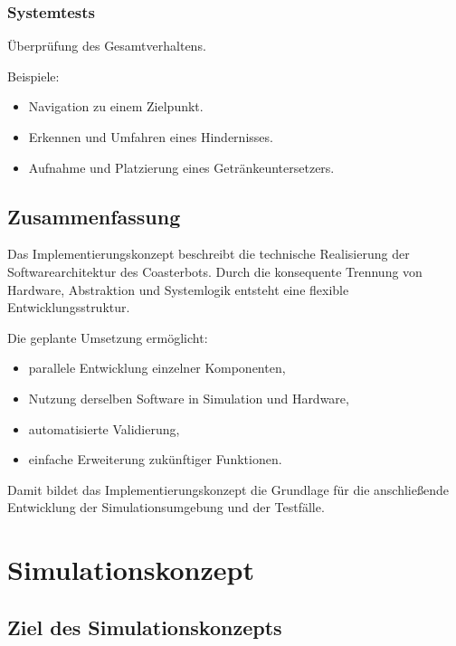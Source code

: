 \subsubsection{Systemtests}\label{systemtests}

Überprüfung des Gesamtverhaltens.

Beispiele:

\begin{itemize}
\tightlist
\item
  Navigation zu einem Zielpunkt.
\item
  Erkennen und Umfahren eines Hindernisses.
\item
  Aufnahme und Platzierung eines Getränkeuntersetzers.
\end{itemize}

\subsection{Zusammenfassung}\label{zusammenfassung-3}

Das Implementierungskonzept beschreibt die technische Realisierung der
Softwarearchitektur des Coasterbots. Durch die konsequente Trennung von
Hardware, Abstraktion und Systemlogik entsteht eine flexible
Entwicklungsstruktur.

Die geplante Umsetzung ermöglicht:

\begin{itemize}
\tightlist
\item
  parallele Entwicklung einzelner Komponenten,
\item
  Nutzung derselben Software in Simulation und Hardware,
\item
  automatisierte Validierung,
\item
  einfache Erweiterung zukünftiger Funktionen.
\end{itemize}

Damit bildet das Implementierungskonzept die Grundlage für die
anschließende Entwicklung der Simulationsumgebung und der Testfälle.

\section{Simulationskonzept}\label{simulationskonzept}

\subsection{Ziel des
Simulationskonzepts}\label{ziel-des-simulationskonzepts}

